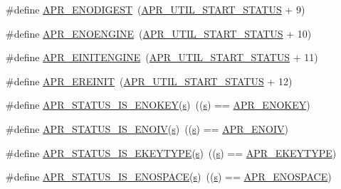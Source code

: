 \begin{DoxyCompactItemize}
\item 
\#define \hyperlink{group__APR__Util__Error_ga93f22e73099e3cd744ea96da38602065}{A\+P\+R\+\_\+\+E\+N\+O\+D\+I\+G\+E\+ST}~(\hyperlink{group__apr__errno_gadf26297a72afa0ea224e7097fe59a1cd}{A\+P\+R\+\_\+\+U\+T\+I\+L\+\_\+\+S\+T\+A\+R\+T\+\_\+\+S\+T\+A\+T\+US} + 9)
\item 
\#define \hyperlink{group__APR__Util__Error_gacda8be948c23dbd1347f3302fb1c577f}{A\+P\+R\+\_\+\+E\+N\+O\+E\+N\+G\+I\+NE}~(\hyperlink{group__apr__errno_gadf26297a72afa0ea224e7097fe59a1cd}{A\+P\+R\+\_\+\+U\+T\+I\+L\+\_\+\+S\+T\+A\+R\+T\+\_\+\+S\+T\+A\+T\+US} + 10)
\item 
\#define \hyperlink{group__APR__Util__Error_ga9d8482ae4b93bdce0f31f120c0511550}{A\+P\+R\+\_\+\+E\+I\+N\+I\+T\+E\+N\+G\+I\+NE}~(\hyperlink{group__apr__errno_gadf26297a72afa0ea224e7097fe59a1cd}{A\+P\+R\+\_\+\+U\+T\+I\+L\+\_\+\+S\+T\+A\+R\+T\+\_\+\+S\+T\+A\+T\+US} + 11)
\item 
\#define \hyperlink{group__APR__Util__Error_ga161b8a0f8e24033e8cd5d9068d524f00}{A\+P\+R\+\_\+\+E\+R\+E\+I\+N\+IT}~(\hyperlink{group__apr__errno_gadf26297a72afa0ea224e7097fe59a1cd}{A\+P\+R\+\_\+\+U\+T\+I\+L\+\_\+\+S\+T\+A\+R\+T\+\_\+\+S\+T\+A\+T\+US} + 12)
\item 
\#define \hyperlink{group__APR__Util__Error_ga060055dd2eb82e8450015fa2fae5f87c}{A\+P\+R\+\_\+\+S\+T\+A\+T\+U\+S\+\_\+\+I\+S\+\_\+\+E\+N\+O\+K\+EY}(\hyperlink{pcretest_8txt_a062597889ba244b72877454b1d3adecf}{s})~((\hyperlink{pcretest_8txt_a062597889ba244b72877454b1d3adecf}{s}) == \hyperlink{group__APR__Util__Error_gabf9bbd463ebcf38611f6acd423e49de9}{A\+P\+R\+\_\+\+E\+N\+O\+K\+EY})
\item 
\#define \hyperlink{group__APR__Util__Error_ga5d6aa91dabbbaa71f11c293af460b143}{A\+P\+R\+\_\+\+S\+T\+A\+T\+U\+S\+\_\+\+I\+S\+\_\+\+E\+N\+O\+IV}(\hyperlink{pcretest_8txt_a062597889ba244b72877454b1d3adecf}{s})~((\hyperlink{pcretest_8txt_a062597889ba244b72877454b1d3adecf}{s}) == \hyperlink{group__APR__Util__Error_ga2df3db3a80a6e153134caf5d3a62a00f}{A\+P\+R\+\_\+\+E\+N\+O\+IV})
\item 
\#define \hyperlink{group__APR__Util__Error_ga0693be89f2dc48f2931ff4572bd5872d}{A\+P\+R\+\_\+\+S\+T\+A\+T\+U\+S\+\_\+\+I\+S\+\_\+\+E\+K\+E\+Y\+T\+Y\+PE}(\hyperlink{pcretest_8txt_a062597889ba244b72877454b1d3adecf}{s})~((\hyperlink{pcretest_8txt_a062597889ba244b72877454b1d3adecf}{s}) == \hyperlink{group__APR__Util__Error_ga637727cdf8285d12663ddf8bb89fa048}{A\+P\+R\+\_\+\+E\+K\+E\+Y\+T\+Y\+PE})
\item 
\#define \hyperlink{group__APR__Util__Error_ga32f4e4d4cff641d33acf3cb722e36b1f}{A\+P\+R\+\_\+\+S\+T\+A\+T\+U\+S\+\_\+\+I\+S\+\_\+\+E\+N\+O\+S\+P\+A\+CE}(\hyperlink{pcretest_8txt_a062597889ba244b72877454b1d3adecf}{s})~((\hyperlink{pcretest_8txt_a062597889ba244b72877454b1d3adecf}{s}) == \hyperlink{group__APR__Util__Error_gaec7a912cf8fe5f964ad8fbbafaff0241}{A\+P\+R\+\_\+\+E\+N\+O\+S\+P\+A\+CE})

\end{DoxyCompactItemize}
